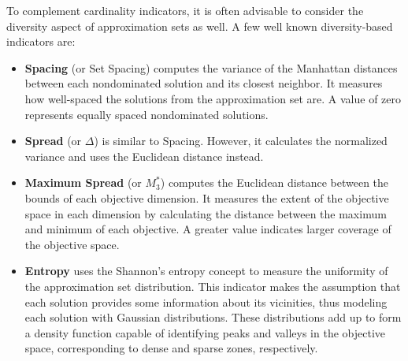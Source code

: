 	To complement cardinality indicators, it is often advisable to consider the diversity aspect of approximation sets as well. A few well known diversity-based indicators are:
	\begin{itemize}
		\item  \textbf{Spacing} (or Set Spacing) computes the variance of the Manhattan distances between each nondominated solution and its closest neighbor. It measures how well-spaced the solutions from the approximation set are. A value of zero represents equally spaced nondominated solutions. 
		\item \textbf{Spread} (or $\Delta$) is similar to Spacing. However, it calculates the normalized variance and uses the Euclidean distance instead.
		\item \textbf{Maximum Spread} (or \textbf{$M_3^\ast$}) computes the Euclidean distance between the bounds of each objective dimension. It measures the extent of the objective space in each dimension by calculating the distance between the maximum and minimum of each objective. A greater value indicates larger coverage of the objective space.
		
		\item \textbf{Entropy} uses the Shannon's entropy concept to measure the uniformity of the approximation set distribution. This indicator makes the assumption that each solution provides some information about its vicinities, thus modeling each solution with Gaussian distributions. These distributions add up to form a density function capable of identifying peaks and valleys in the objective space, corresponding to dense and sparse zones, respectively. 
		

\end{itemize}

